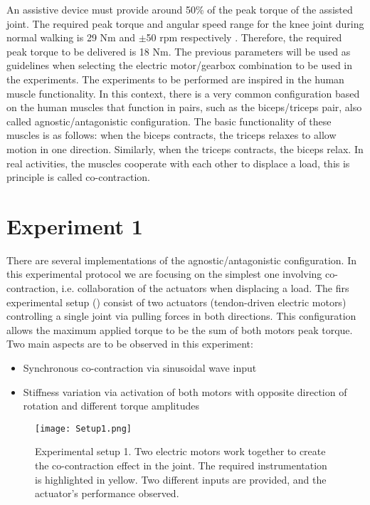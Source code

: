 An assistive device must provide around 50\% of the peak torque of the assisted joint. The required peak torque and angular speed range for the knee joint during normal walking is 29 Nm and $\pm$50 rpm respectively \cite{dos2014impedance,winter2009biomechanics}. Therefore, the required peak torque to be delivered is 18 Nm. The previous parameters will be used as guidelines when selecting the electric motor/gearbox combination to be used in the experiments.
The experiments to be performed are inspired in the human muscle functionality. In this context, there is a very common configuration based on the human muscles that function in pairs, such as the biceps/triceps pair, also called agnostic/antagonistic configuration. The basic functionality of these muscles is as follows: when the biceps contracts, the triceps relaxes to allow motion in one direction. Similarly, when the triceps contracts, the biceps relax. In real activities, the muscles cooperate with each other to displace a load, this is principle is called co-contraction.


\section{Experiment 1}

There are several implementations of the agnostic/antagonistic configuration. In this experimental protocol we are focusing on the simplest one involving co-contraction, i.e. collaboration of the actuators when displacing a load. The firs experimental setup () consist of two actuators (tendon-driven electric motors) controlling a single joint via pulling forces in both directions. This configuration allows the maximum applied torque to be the sum of both motors peak torque. Two main aspects are to be observed in this experiment: 

\begin{itemize}
    \item Synchronous co-contraction via sinusoidal wave input
    \item Stiffness variation via activation of both motors with opposite direction of rotation and different torque amplitudes
\end{itemize}

\begin{figure}[hbt!]
    \centering
    \texttt{[image: Setup1.png]}
    \caption{Experimental setup 1. Two electric motors work together to create the co-contraction effect in the joint. The required instrumentation is highlighted in yellow. Two different inputs are provided, and the actuator's performance observed.}
    \label{fig:setup1}
\end{figure}

